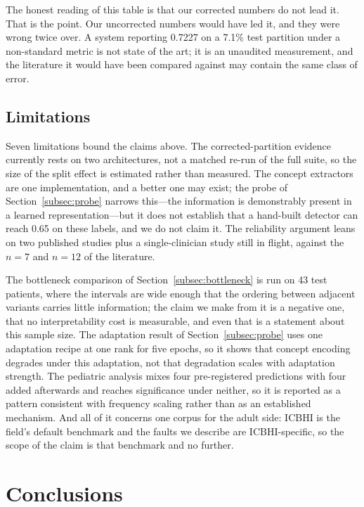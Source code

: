 \documentclass[journal,onecolumn]{IEEEtran}
\begin{document}
The honest reading of this table is that our corrected numbers do not lead it. That
is the point. Our uncorrected numbers would have led it, and they were wrong twice
over. A system reporting 0.7227 on a 7.1\% test partition under a non-standard metric
is not state of the art; it is an unaudited measurement, and the literature it would
have been compared against may contain the same class of error.

\subsection{Limitations}
\label{subsec:limitations}

Seven limitations bound the claims above. The corrected-partition evidence currently
rests on two architectures, not a matched re-run of the full suite, so the size of the
split effect is estimated rather than measured. The concept extractors are one
implementation, and a better one may exist; the probe of
Section~\ref{subsec:probe} narrows this---the information is demonstrably present in a
learned representation---but it does not establish that a hand-built detector can reach
0.65 on these labels, and we do not claim it. The reliability argument leans on two
published studies plus a single-clinician study still in flight, against the $n=7$ and
$n=12$ of the literature.

The bottleneck comparison of Section~\ref{subsec:bottleneck} is run on 43 test patients,
where the intervals are wide enough that the ordering between adjacent variants carries
little information; the claim we make from it is a negative one, that no
interpretability cost is measurable, and even that is a statement about this sample
size. The adaptation result of Section~\ref{subsec:probe} uses one adaptation recipe at
one rank for five epochs, so it shows that concept encoding degrades under this
adaptation, not that degradation scales with adaptation strength. The pediatric analysis
mixes four pre-registered predictions with four added afterwards and reaches
significance under neither, so it is reported as a pattern consistent with frequency
scaling rather than as an established mechanism. And all of it concerns one corpus for
the adult side: ICBHI is the field's default benchmark and the faults we describe are
ICBHI-specific, so the scope of the claim is that benchmark and no further.

\section{Conclusions}
\label{sec:conclusion}
\end{document}
